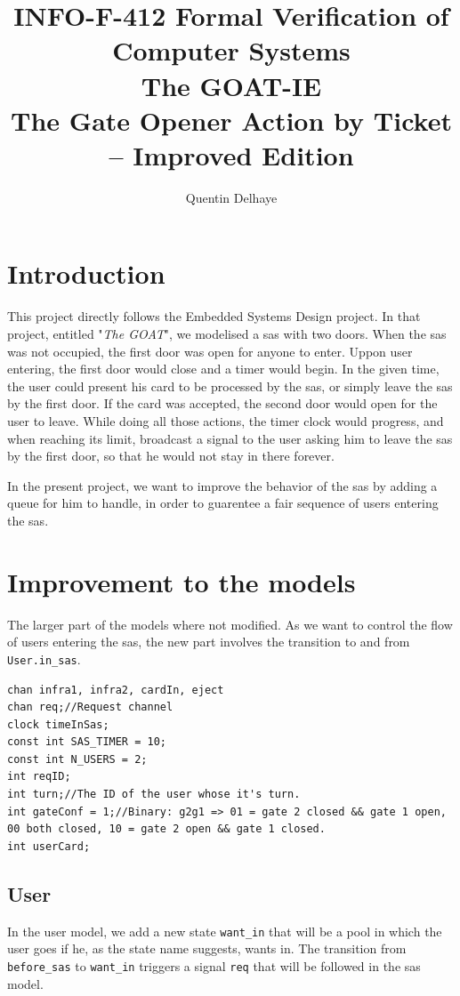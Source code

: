 \documentclass[10pt,a4paper]{article}
\title{INFO-F-412 Formal Verification of Computer Systems\\The GOAT-IE\\ \large{The Gate Opener Action by Ticket -- Improved Edition}}
\author{Quentin Delhaye}
\begin{document}
 
\maketitle

\section{Introduction}
This project directly follows the Embedded Systems Design project.
In that project, entitled "\textit{The GOAT}", we modelised a sas with two doors.
When the sas was not occupied, the first door was open for anyone to enter.
Uppon user entering, the first door would close and a timer would begin.
In the given time, the user could present his card to be processed by the sas, or simply leave the sas by the first door.
If the card was accepted, the second door would open for the user to leave.
While doing all those actions, the timer clock would progress, and when reaching its limit, broadcast a signal to the user asking him to leave the sas by the first door, so that he would not stay in there forever.

In the present project, we want to improve the behavior of the sas by adding a queue for him to handle, in order to guarentee a fair sequence of users entering the sas.

\section{Improvement to the models}
The larger part of the models where not modified.
As we want to control the flow of users entering the sas, the new part involves the transition to and from \texttt{User.in\_sas}.

\begin{lstlisting}[caption=Global system declarations., label=lst:globalDecl]
chan infra1, infra2, cardIn, eject
chan req;//Request channel
clock timeInSas;
const int SAS_TIMER = 10;
const int N_USERS = 2;
int reqID;
int turn;//The ID of the user whose it's turn.
int gateConf = 1;//Binary: g2g1 => 01 = gate 2 closed && gate 1 open, 00 both closed, 10 = gate 2 open && gate 1 closed.
int userCard;
\end{lstlisting}

\subsection{User}
In the user model, we add a new state \texttt{want\_in} that will be a pool in which the user goes if he, as the state name suggests, wants in.
The transition from \texttt{before\_sas} to \texttt{want\_in} triggers a signal \texttt{req} that will be followed in the sas model.
\end{document}
